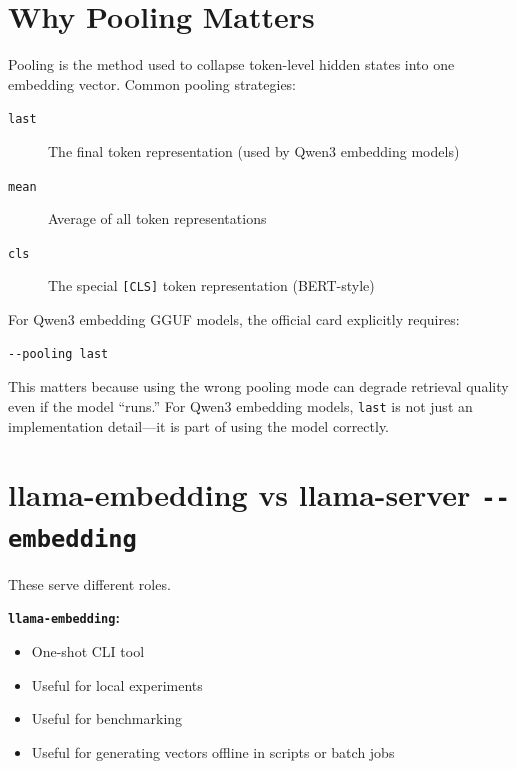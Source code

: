 \section{Why Pooling Matters}

Pooling is the method used to collapse token-level hidden states into one embedding vector.
Common pooling strategies:

\begin{description}
    \item[\texttt{last}] The final token representation (used by Qwen3 embedding models)
    \item[\texttt{mean}] Average of all token representations
    \item[\texttt{cls}] The special \texttt{[CLS]} token representation (BERT-style)
\end{description}

For Qwen3 embedding GGUF models, the official card explicitly requires:

\begin{Verbatim}
--pooling last
\end{Verbatim}

This matters because using the wrong pooling mode can degrade retrieval quality even if the
model ``runs.'' For Qwen3 embedding models, \texttt{last} is not just an implementation
detail---it is part of using the model correctly.

\section{llama-embedding vs llama-server \texttt{-{}-embedding}}

These serve different roles.

\textbf{\texttt{llama-embedding}:}

\begin{itemize}
    \item One-shot CLI tool
    \item Useful for local experiments
    \item Useful for benchmarking
    \item Useful for generating vectors offline in scripts or batch jobs
\end{itemize}


